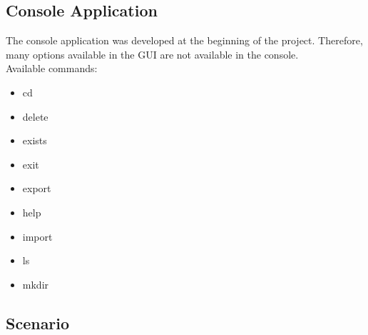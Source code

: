 \documentclass[JCDReport.tex]{subfiles}
\begin{document}
\subsection{Console Application}


The console application was developed at the beginning of the project. Therefore, many options available in the GUI are not available in the console.\\

Available commands:
\begin{itemize}
\item cd
\item delete
\item exists
\item exit
\item export
\item help
\item import
\item ls
\item mkdir
\end{itemize}



\subsection{Scenario}

\end{document}
